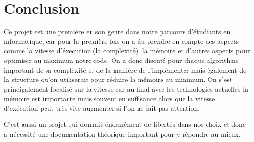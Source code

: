 \documentclass[12pt, oneside]{article}
\begin{document}
\section{Conclusion}
Ce projet est une première en son genre dans notre parcours d'étudiants en informatique, car pour la première fois on a du prendre en compte des aspects comme la vitesse d'éxecution (la complexité), la mémoire et d'autres aspects pour optimiser au maximum notre code. On a donc discuté pour chaque algorithme important de sa complexité et de la manière de l'implémenter mais également de la structure qu'on utiliserait pour réduire la mémoire au minimum. On s'est principalement focalisé sur la vitesse car au final avec les technologies actuelles la mémoire est importante mais souvent en suffisance alors que la vitesse d'exécution peut très vite augmenter si l'on ne fait pas attention.

C'est aussi un projet qui donnait énormément de libertés dans nos choix et donc a nécessité une documentation théorique important pour y répondre au mieux.
\end{document}
